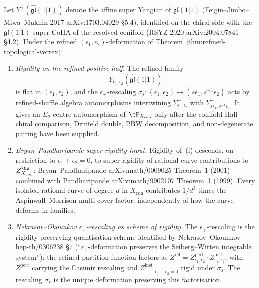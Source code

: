 \begin{theorem}
\label{thm:super-rigidity-e2-centre}
Let $Y^{+}(\widehat{\mathfrak{gl}}(1|1))$ denote the affine super
Yangian of $\mathfrak{gl}(1|1)$ (Feigin--Jimbo--Miwa--Mukhin 2017
\textup{arXiv:1703.04029} \S5.4), identified on the chiral side with
the $\mathfrak{gl}(1|1)$-super CoHA of the resolved conifold (RSYZ
2020 \textup{arXiv:2004.07841} \S4.2). Under the refined
$(\epsilon_1, \epsilon_2)$-deformation of
Theorem~\ref{thm:refined-topological-vertex}:
\begin{enumerate}[label=\textup{(\roman*)}]
\item \emph{Rigidity on the refined positive half.} The refined
 family
 \[
 Y^{+}_{\epsilon_1, \epsilon_2}(\widehat{\mathfrak{gl}}(1|1))
 \]
 is flat in $(\epsilon_1, \epsilon_2)$, and the $\epsilon_+$-rescaling
 $\sigma_s \colon (\epsilon_1, \epsilon_2) \mapsto (s\epsilon_1,
 s^{-1}\epsilon_2)$ acts by refined-shuffle algebra automorphisms
intertwining $Y^{+}_{\epsilon_1, \epsilon_2}$ with
$Y^{+}_{s\epsilon_1, s^{-1}\epsilon_2}$. It gives an $E_2$-centre
automorphism of $\cF_{X_{\mathrm{con}}}$ only after the conifold
Hall--chiral comparison, Drinfeld double, PBW decomposition, and
non-degenerate pairing have been supplied.
\item \emph{Bryan--Pandharipande super-rigidity input.} Rigidity
 of~(i) descends, on restriction to $\epsilon_1 + \epsilon_2 = 0$, to
 super-rigidity of rational-curve contributions to
 $Z^{\GW}_{X_{\mathrm{con}}}$: Bryan--Pandharipande
 \textup{arXiv:math/0009025} Theorem~1 (2001) combined with
 Pandharipande \textup{arXiv:math/9902107} Theorem~1 (1999). Every
 isolated rational curve of degree $d$ in $X_{\mathrm{con}}$
 contributes $1/d^{3}$ times the Aspinwall--Morrison multi-cover
 factor, independently of how the curve deforms in families.
\item \emph{Nekrasov--Okounkov $\epsilon_+$-rescaling as scheme of
 rigidity.} The $\epsilon_+$-rescaling is the rigidity-preserving
 quantisation scheme identified by Nekrasov--Okounkov
 \textup{hep-th/0306238} \S7 (``$\epsilon_+$-deformation preserves
 the Seiberg--Witten integrable system''): the refined partition
 function factors as $Z^{\mathrm{ref}} =
 Z^{\mathrm{pert}}_{\epsilon_1, \epsilon_2} \cdot
 Z^{\mathrm{inst}}_{\epsilon_1, \epsilon_2}$, with
 $Z^{\mathrm{pert}}$ carrying the Casimir rescaling and
 $Z^{\mathrm{inst}}\bigl|_{\epsilon_1 + \epsilon_2 = 0}$ rigid under
 $\sigma_s$. The rescaling $\sigma_s$ is the unique deformation
 preserving this factorisation.
\end{enumerate}
\end{theorem}

